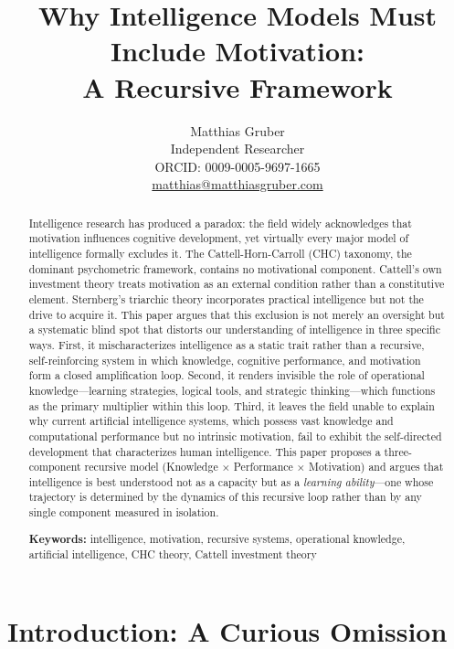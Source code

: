 \documentclass[12pt,a4paper]{article}
\title{Why Intelligence Models Must Include Motivation:\\
\medskip
A Recursive Framework}
\author{Matthias Gruber\\
\small Independent Researcher\\
\small ORCID: 0009-0005-9697-1665\\
\small \href{mailto:matthias@matthiasgruber.com}{matthias@matthiasgruber.com}}
\date{}
\begin{document}
\maketitle

\begin{abstract}
Intelligence research has produced a paradox: the field widely acknowledges that motivation influences cognitive development, yet virtually every major model of intelligence formally excludes it. The Cattell-Horn-Carroll (CHC) taxonomy, the dominant psychometric framework, contains no motivational component. Cattell's own investment theory treats motivation as an external condition rather than a constitutive element. Sternberg's triarchic theory incorporates practical intelligence but not the drive to acquire it. This paper argues that this exclusion is not merely an oversight but a systematic blind spot that distorts our understanding of intelligence in three specific ways. First, it mischaracterizes intelligence as a static trait rather than a recursive, self-reinforcing system in which knowledge, cognitive performance, and motivation form a closed amplification loop. Second, it renders invisible the role of operational knowledge---\hspace{0pt}learning strategies, logical tools, and strategic thinking---\hspace{0pt}which functions as the primary multiplier within this loop. Third, it leaves the field unable to explain why current artificial intelligence systems, which possess vast knowledge and computational performance but no intrinsic motivation, fail to exhibit the self-directed development that characterizes human intelligence. This paper proposes a three-component recursive model (Knowledge × Performance × Motivation) and argues that intelligence is best understood not as a capacity but as a \emph{learning ability}---\hspace{0pt}one whose trajectory is determined by the dynamics of this recursive loop rather than by any single component measured in isolation.

\medskip
\noindent\textbf{Keywords:} intelligence, motivation, recursive systems, operational knowledge, artificial intelligence, CHC theory, Cattell investment theory
\end{abstract}


\section{Introduction: A Curious Omission}
\end{document}

